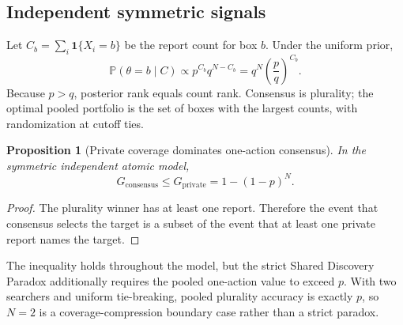 \documentclass[11pt]{article}
\newtheorem{proposition}{Proposition}
\theoremstyle{definition}
\theoremstyle{remark}
\newcommand{\Prob}{\mathbb{P}}
\newcommand{\1}{\mathbf{1}}
\newcommand{\priv}{\mathrm{private}}
\newcommand{\cons}{\mathrm{consensus}}
\begin{document}
\subsection{Independent symmetric signals}
\label{sec:signals}

Let $C_b=\sum_i\1\{X_i=b\}$ be the report count for box $b$. Under the uniform prior,
\begin{equation}
\Prob(\theta=b\mid C)
\propto p^{C_b}q^{N-C_b}
=q^N\left(\frac{p}{q}\right)^{C_b}.
\label{eq:posterior-count}
\end{equation}
Because $p>q$, posterior rank equals count rank. Consensus is plurality; the optimal pooled portfolio is the set of boxes with the largest counts, with randomization at cutoff ties.

\begin{proposition}[Private coverage dominates one-action consensus]
In the symmetric independent atomic model,
\[
G_{\cons}\le G_{\priv}=1-(1-p)^N.
\]
\end{proposition}

\begin{proof}
The plurality winner has at least one report. Therefore the event that consensus selects the target is a subset of the event that at least one private report names the target.
\end{proof}

The inequality holds throughout the model, but the strict Shared Discovery Paradox additionally requires the pooled one-action value to exceed $p$. With two searchers and uniform tie-breaking, pooled plurality accuracy is exactly $p$, so $N=2$ is a coverage-compression boundary case rather than a strict paradox.
\end{document}
